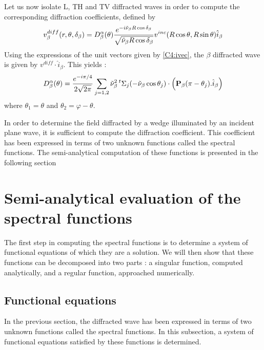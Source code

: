 Let us now isolate L, TH and TV diffracted waves in order to compute the corresponding diffraction coefficients, defined by
\begin{equation}
v_{\beta}^{diff}(r,\theta,\delta_{\beta})=D_{\beta}^{\alpha}(\theta)\frac{e^{-i\tilde{\nu}_{\beta}R\cos\delta_{\beta}}}{\sqrt{\tilde{\nu}_{\beta}R\cos\delta_{\beta}}} v^{inc}(R\cos\theta,R\sin\theta) \hat{i}_{\beta}
\label{C4:coeffdiff}
\end{equation}
Using the expressions of the unit vectors given by \eqref{C4:ivec}, the $\beta$ diffracted wave is given by $v^{diff}\cdot \hat{i}_{\beta}$. This yields :
\begin{equation}
D_{\beta}^{\alpha}(\theta)=\frac{e^{-i\pi/4}}{2\sqrt{2\pi}}\sum_{j=1,2}\tilde{\nu}_{\beta}^2 \,{}^t \Sigma_j(-\tilde{\nu}_{\beta}\cos\theta_j)\cdot\left(\mathbf{P}_{\beta}(\pi-\theta_j).\hat{i}_{\beta}\right)
\label{C4:Dbeta}
\end{equation}
where $\theta_1=\theta$ and $\theta_2=\varphi-\theta$.

In order to determine the field diffracted by a wedge illuminated by an incident plane wave, it is sufficient to compute the diffraction coefficient. This coefficient has been expressed in terms of two unknown functions called the spectral functions. The semi-analytical computation of these functions is presented in the following section

\section{Semi-analytical evaluation of the spectral functions}
The first step in computing the spectral functions is to determine a system of functional equations of which they are a solution. We will then show that these functions can be decomposed into two parts : a singular function, computed analytically, and a regular function, approached numerically.
\subsection{Functional equations}
In the previous section, the diffracted wave has been expressed in terms of two unknown functions called the spectral functions. In this subsection, a system of functional equations satisfied by these functions is determined. 

